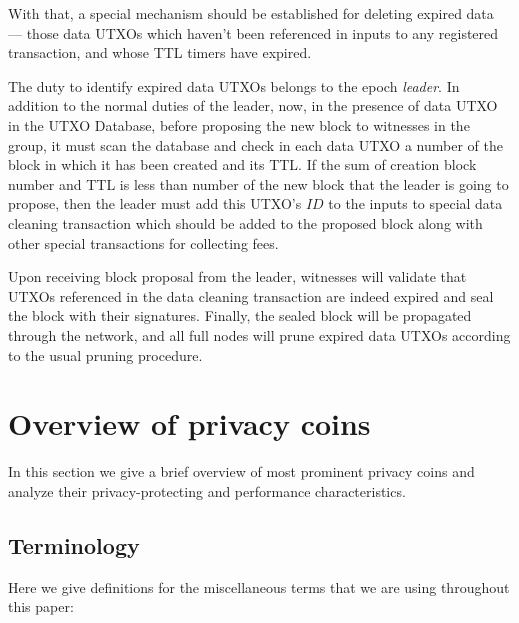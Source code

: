 \documentclass[a4paper, 10pt, conference]{ieeeconf}
\begin{document}
With that, a special mechanism should be established for deleting expired data --- those data UTXOs which haven't been referenced in inputs to any registered transaction, and whose TTL timers have expired.

The duty to identify expired data UTXOs belongs to the epoch \textit{leader}. In addition to the normal duties of the leader, now, in the presence of data UTXO in the UTXO Database, before proposing the new block to witnesses in the group, it must scan the database and check in each data UTXO a number of the block in which it has been created and its TTL. If the sum of creation block number and TTL is less than number of the new block that the leader is going to propose, then the leader must add this UTXO's $ID$ to the inputs to special data cleaning transaction which should be added to the proposed block along with other special transactions for collecting fees. 

Upon receiving block proposal from the leader, witnesses will validate that UTXOs referenced in the data cleaning transaction are indeed expired and seal the block with their signatures. Finally, the sealed block will be propagated through the network, and all full nodes will prune expired data UTXOs according to the usual pruning procedure.

\section{Overview of privacy coins}\label{PrivacyCoinsAppendix}
In this section we give a brief overview of most prominent privacy coins and analyze their privacy-protecting and performance characteristics.

\subsection{Terminology}
Here we give definitions for the miscellaneous terms that we are using throughout this paper:
\end{document}
